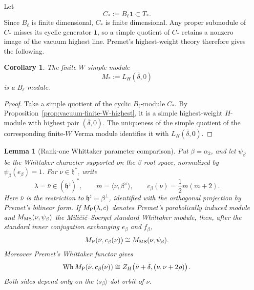 \documentclass[11pt]{amsart}
\newtheorem{lemma}[theorem]{Lemma}
\newtheorem{corollary}[theorem]{Corollary}
\theoremstyle{remark}
\numberwithin{equation}{section}
\begin{document}
Let
\begin{equation}
   C_*:=B_\ell\mathbf1\subset T_*.
\end{equation}
Since \(B_\ell\) is finite dimensional, \(C_*\) is finite dimensional.  Any
proper submodule of \(C_*\) misses its cyclic generator \(\mathbf1\), so a
simple quotient of \(C_*\) retains a nonzero image of the vacuum highest
line.  Premet's highest-weight theory therefore gives the following.

\begin{corollary}
\label{cor:Mstar-B-module}
The finite-\(W\) simple module
\begin{equation}
   M_*:=L_H(\bar\delta,0)
\end{equation}
is a \(B_\ell\)-module.
\end{corollary}

\begin{proof}
Take a simple quotient of the cyclic \(B_\ell\)-module \(C_*\).  By
Proposition~\ref{prop:vacuum-finite-W-highest}, it is a simple highest-weight
\(H\)-module with highest pair \((\bar\delta,0)\).  The uniqueness of the
simple quotient of the corresponding finite-\(W\) Verma module
\cite[Section~7]{Premet2007} identifies it with
\(L_H(\bar\delta,0)\).
\end{proof}


\begin{lemma}[Rank-one Whittaker parameter comparison]
\label{lem:premet-ms-parameter}
Put \(\beta=\alpha_2\), and let \(\psi_\beta\) be the Whittaker
character supported on the \(\beta\)-root space, normalized by
\(\psi_\beta(e_\beta)=1\).  For \(\nu\in\mathfrak h^*\), write
\[
   \lambda=\bar\nu\in(\mathfrak h^\natural)^*,
   \qquad
   m=\langle\nu,\beta^\vee\rangle,
   \qquad
   c_\beta(\nu)=\frac12m(m+2).
\]
Here \(\bar\nu\) is the restriction to
\(\mathfrak h^\natural=\beta^\perp\), identified with the orthogonal
projection by Premet's bilinear form.  If \(M_{\rm P}(\lambda,c)\) denotes
Premet's parabolically induced module and \(M_{\rm MS}(\nu,\psi_\beta)\)
the Mili\v{c}i\'c--Soergel standard Whittaker module, then, after the
standard inner conjugation exchanging \(e_\beta\) and \(f_\beta\),
\begin{equation}
\label{eq:Premet-MS-standard-comparison}
   M_{\rm P}\!\left(\bar\nu,c_\beta(\nu)\right)
   \cong
   M_{\rm MS}(\nu,\psi_\beta).
\end{equation}
Moreover Premet's Whittaker functor gives
\begin{equation}
\label{eq:Premet-MS-finiteW-parameters}
   \operatorname{Wh}
   M_{\rm P}\!\left(\bar\nu,c_\beta(\nu)\right)
   \cong
   Z_H\!\left(
      \bar\nu+\bar\delta,
      (\nu,\nu+2\rho)
   \right).
\end{equation}
Both sides depend only on the
\(\langle s_\beta\rangle\)-dot orbit of \(\nu\).
\end{lemma}
\end{document}
